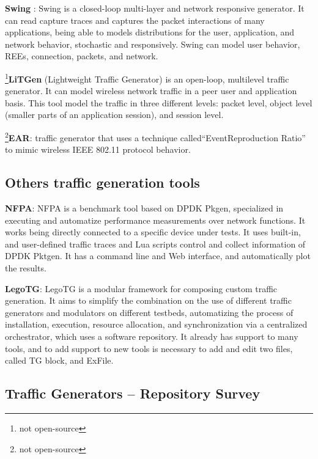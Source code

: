 \textbf{Swing}\cite{swing-paper} \cite{web-swing}: Swing is a closed-loop multi-layer and network responsive generator. It can read capture traces and captures the packet interactions of many applications, being able to models distributions for the user, application, and network behavior, stochastic and responsively. Swing can model user behavior, REEs, connection, packets, and network. 

\footnote{not open-source}\textbf{LiTGen} (Lightweight Traffic Generator)\cite{litgen-paper} is an open-loop, multilevel traffic generator. It can model wireless network traffic in a peer user and application basis. This tool model the traffic in three different levels: packet level, object level (smaller parts of an application session), and session level.


\footnote{not open-source}\textbf{EAR}\cite{ear-paper}: traffic generator that uses a technique called“EventReproduction Ratio” to mimic wireless IEEE 802.11 protocol behavior. 



\subsection{Others traffic generation tools}


\textbf{NFPA}\cite{nfpa-paper}:  NFPA is a benchmark tool based on DPDK Pkgen, specialized in executing and automatize performance measurements over network functions. It works being directly connected to a specific device under tests. It uses built-in, and user-defined traffic traces and Lua scripts control and collect information of DPDK Pktgen. It has a command line and Web interface, and automatically plot the results. 

\textbf{LegoTG}\cite{legotg-paper}:  LegoTG is a modular framework for composing custom traffic generation. It aims to simplify the combination on the use of different traffic generators and modulators on different testbeds, automatizing the process of installation, execution, resource allocation, and synchronization via a centralized orchestrator, which uses a software repository. It already has support to many tools, and to add support to new tools is necessary to add and edit two files, called TG block, and ExFile.


\subsection{Traffic Generators -- Repository Survey}

